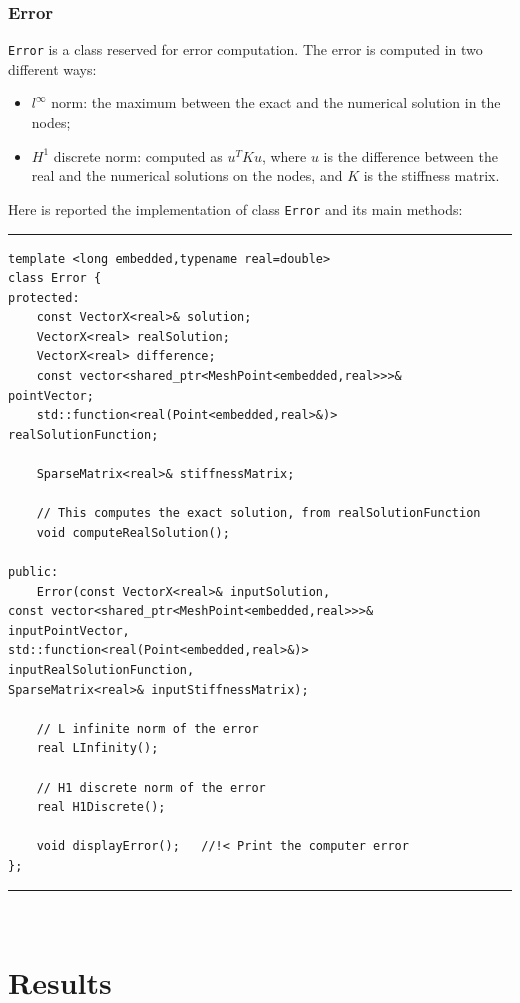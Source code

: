 \subsubsection{Error}
\verb|Error| is a class reserved for error computation. The error is computed in two different ways:
\begin{itemize}
\item $l^\infty$ norm: the maximum between the exact and the numerical solution in the nodes;
\item $H^1$ discrete norm: computed as $u^TKu$, where $u$ is the difference between the real and the numerical solutions on the nodes, and $K$ is the stiffness matrix. 
\end{itemize}

Here is reported the implementation of class \verb|Error| and its main methods:

\noindent\rule{12.7cm}{1pt}
\begin{lstlisting}[caption=File \texttt{Error.h}]
template <long embedded,typename real=double>
class Error {
protected:
    const VectorX<real>& solution;
    VectorX<real> realSolution;
    VectorX<real> difference;
    const vector<shared_ptr<MeshPoint<embedded,real>>>& 
pointVector;
    std::function<real(Point<embedded,real>&)> 
realSolutionFunction;
	
    SparseMatrix<real>& stiffnessMatrix;
	
    // This computes the exact solution, from realSolutionFunction
    void computeRealSolution(); 
	
public:
    Error(const VectorX<real>& inputSolution,
const vector<shared_ptr<MeshPoint<embedded,real>>>& 
inputPointVector,
std::function<real(Point<embedded,real>&)> 
inputRealSolutionFunction,
SparseMatrix<real>& inputStiffnessMatrix);

    // L infinite norm of the error
    real LInfinity();
	
    // H1 discrete norm of the error
    real H1Discrete();
	
    void displayError();   //!< Print the computer error	
};
\end{lstlisting}
\noindent\rule{12.7cm}{1pt}\\

\newpage
\section{Results}

